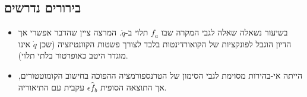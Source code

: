 \subsection*{בירורים נדרשים}
\begin{itemize}
    \item בשיעור נשאלה שאלה לגבי המקרה שבו $f_{a}$ תלוי ב-$\dot{q}$. המרצה ציין
        שהדבר אפשרי אך הדיון הוגבל לפונקציות של הקואורדינטות בלבד לצורך פשטות
        הקוונטיזציה (שכן $\dot{q}$ אינו מוגדר היטב כאופרטור בלתי תלוי).

    \item הייתה אי-בהירות מסוימת לגבי הסימון של הטרנספורמציה ההפוכה בחישוב הקומוטטורים,
        אך התוצאה הסופית $\epsilon \hat{f}_{b}$ עקבית עם התיאוריה.
\end{itemize}